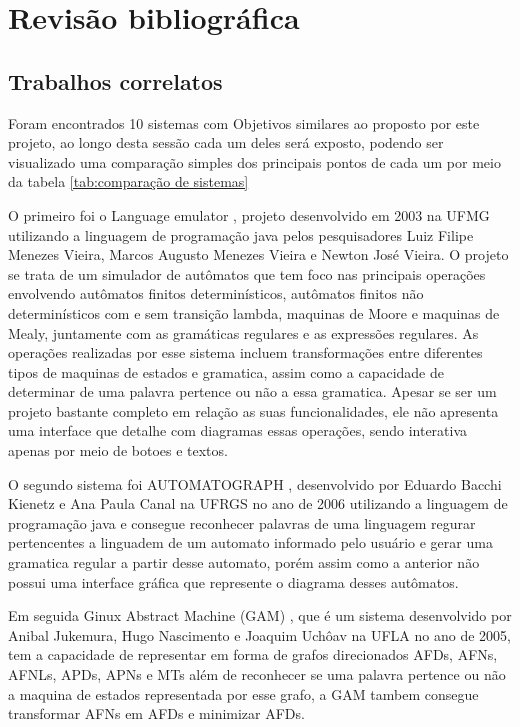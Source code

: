 \chapter{Revisão bibliográfica}
\label{cap:revisao}



\section{Trabalhos correlatos}

Foram encontrados 10 sistemas com Objetivos similares ao proposto por este projeto, ao longo desta sessão cada um deles será exposto, podendo ser visualizado uma comparação simples dos principais pontos de cada um por meio da tabela \ref{tab:comparação de sistemas}

O primeiro foi o Language emulator \cite{LanguageEmulator}, projeto desenvolvido em 2003 na UFMG  utilizando a linguagem de programação java pelos pesquisadores Luiz Filipe Menezes Vieira, Marcos Augusto Menezes Vieira e Newton José Vieira. O projeto se trata de um simulador de autômatos que tem foco nas principais operações envolvendo autômatos finitos determinísticos, autômatos finitos não determinísticos com e sem transição lambda, maquinas de Moore e maquinas de Mealy, juntamente com as gramáticas regulares e as expressões regulares. As operações realizadas por esse sistema incluem transformações entre diferentes tipos de maquinas de estados e gramatica, assim como a capacidade de determinar de uma palavra pertence ou não a essa gramatica. Apesar se ser um projeto bastante completo em relação as suas funcionalidades, ele não apresenta uma interface que detalhe com diagramas essas operações, sendo interativa apenas por meio de botoes e textos.

O segundo sistema foi AUTOMATOGRAPH  \cite{AUTOMATOGRAPH}, desenvolvido por Eduardo Bacchi Kienetz e Ana Paula Canal na UFRGS no ano de 2006 utilizando a linguagem de programação java e consegue reconhecer palavras de uma linguagem regurar pertencentes a linguadem de um automato informado pelo usuário e gerar uma gramatica regular a partir desse automato, porém assim como a anterior não possui uma interface gráfica que represente o diagrama desses autômatos.

Em seguida Ginux Abstract Machine (GAM) \cite{GAM}, que é um sistema desenvolvido por Anibal Jukemura, Hugo Nascimento e Joaquim Uchôav na UFLA no ano de 2005, tem a capacidade de representar em forma de grafos direcionados AFDs, AFNs, AFNLs, APDs, APNs e MTs além de reconhecer se uma palavra pertence ou não a maquina de estados representada por esse grafo, a GAM tambem consegue transformar AFNs em AFDs e minimizar AFDs.

